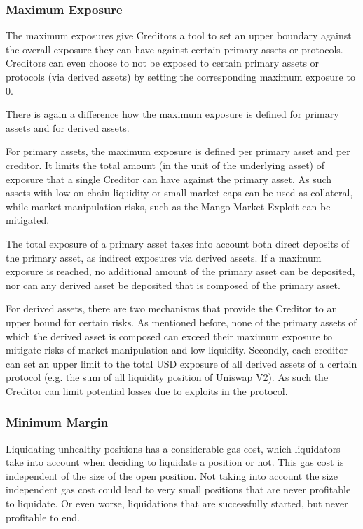 \documentclass[sigconf,nonacm]{acmart}
\begin{document}
\subsubsection{Maximum Exposure}
The maximum exposures give Creditors a tool to set an upper boundary against the overall exposure they can have against certain primary assets or protocols.
Creditors can even choose to not be exposed to certain primary assets or protocols (via derived assets) by setting the corresponding maximum exposure to 0.

There is again a difference how the maximum exposure is defined for primary assets and for derived assets.

For primary assets, the maximum exposure is defined per primary asset and per creditor.
It limits the total amount (in the unit of the underlying asset) of exposure that a single Creditor can have against the primary asset.
As such assets with low on-chain liquidity or small market caps can be used as collateral,
while market manipulation risks, such as the Mango Market Exploit\cite{coindeskDeFiExchange} can be mitigated.

The total exposure of a primary asset takes into account both direct deposits of the primary asset, as indirect exposures via derived assets.
If a maximum exposure is reached, no additional amount of the primary asset can be deposited, nor can any derived asset be deposited that is composed of the primary asset.

For derived assets, there are two mechanisms that provide the Creditor to an upper bound for certain risks.
As mentioned before, none of the primary assets of which the derived asset is composed can exceed their maximum exposure to mitigate risks of market manipulation and low liquidity.
Secondly, each creditor can set an upper limit to the total USD exposure of all derived assets of a certain protocol (e.g. the sum of all liquidity position of Uniswap V2).
As such the Creditor can limit potential losses due to exploits in the protocol.

\subsubsection{Minimum Margin}
Liquidating unhealthy positions has a considerable gas cost, which liquidators take into account when deciding to liquidate a position or not.
This gas cost is independent of the size of the open position.
Not taking into account the size independent gas cost could lead to very small positions that are never profitable to liquidate.
Or even worse, liquidations that are successfully started, but never profitable to end.
\end{document}
